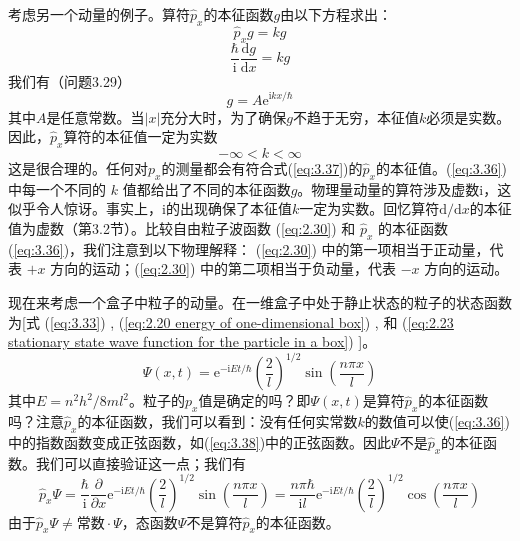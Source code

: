	考虑另一个动量的例子。算符$\hat{p}_x$的本征函数$g$由以下方程求出：
	\begin{equation*}
		\hat{p}_x g =kg
	\end{equation*}
	\begin{equation}
		\frac{\hbar}{\mathrm{i}} \frac{\mathrm{d}g}{\mathrm{d}x} = kg
		\label{eq:3.35}
	\end{equation}
	我们有（问题3.29）
	\begin{equation}
		g = A\mathrm{e}^{\mathrm{i}kx/\hbar}
		\label{eq:3.36}
	\end{equation}
	其中$A$是任意常数。当$\left|x\right|$充分大时，为了确保$g$不趋于无穷，本征值$k$必须是实数。因此，$\hat{p}_x$算符的本征值一定为实数
	\begin{equation}
		-\infty < k < \infty
		\label{eq:3.37}
	\end{equation}
	这是很合理的。任何对$p_x$的测量都会有符合式(\ref{eq:3.37})的$\hat{p}_x$的本征值。(\ref{eq:3.36}) 中每一个不同的 $k$ 值都给出了不同的本征函数$g$。物理量动量的算符涉及虚数$\mathrm{i}$，这似乎令人惊讶。事实上，$\mathrm{i}$的出现确保了本征值$k$一定为实数。回忆算符$\mathrm{d}/\mathrm{d}x$的本征值为虚数（第3.2节）。比较自由粒子波函数 (\ref{eq:2.30}) 和 $\hat{p}_x$ 的本征函数 (\ref{eq:3.36})，我们注意到以下物理解释： (\ref{eq:2.30}) 中的第一项相当于正动量，代表 $+x$ 方向的运动；(\ref{eq:2.30}) 中的第二项相当于负动量，代表 $-x$ 方向的运动。

	现在来考虑一个盒子中粒子的动量。在一维盒子中处于静止状态的粒子的状态函数为[式 (\ref{eq:3.33}) , (\ref{eq:2.20 energy of one-dimensional box}) , 和 (\ref{eq:2.23 stationary state wave function for the particle in a box}) ]。
	\begin{equation}
		\Psi\left(x,t\right) = \mathrm{e}^{-\mathrm{i}Et/\hbar}\left(\frac{2}{l}\right)^{1/2}\sin\left(\frac{n\pi x}{l}\right)
		\label{eq:3.38}
	\end{equation}
	其中$E = n^2h^2/8ml^2$。粒子的$p_x$值是确定的吗？即$\Psi\left(x,t\right)$是算符$\hat{p}_x$的本征函数吗？注意$\hat{p}_x$的本征函数，我们可以看到：没有任何实常数$k$的数值可以使(\ref{eq:3.36})中的指数函数变成正弦函数，如(\ref{eq:3.38})中的正弦函数。因此$\Psi$不是$\hat{p}_x$的本征函数。我们可以直接验证这一点；我们有
	\begin{equation*}
		\hat{p}_x\Psi = \frac{\hbar}{\mathrm{i}}\frac{\partial}{\partial x}\mathrm{e}^{-\mathrm{i}Et/\hbar}\left(\frac{2}{l}\right)^{1/2}\sin\left(\frac{n\pi x}{l}\right) = \frac{n\pi \hbar}{\mathrm{i}l}\mathrm{e}^{-\mathrm{i}Et/\hbar}\left(\frac{2}{l}\right)^{1/2}\cos\left(\frac{n\pi x}{l}\right)
	\end{equation*}
	由于$\hat{p}_x\Psi \neq \text{常数} \cdot \Psi$，态函数$\Psi$不是算符$\hat{p}_x$的本征函数。

